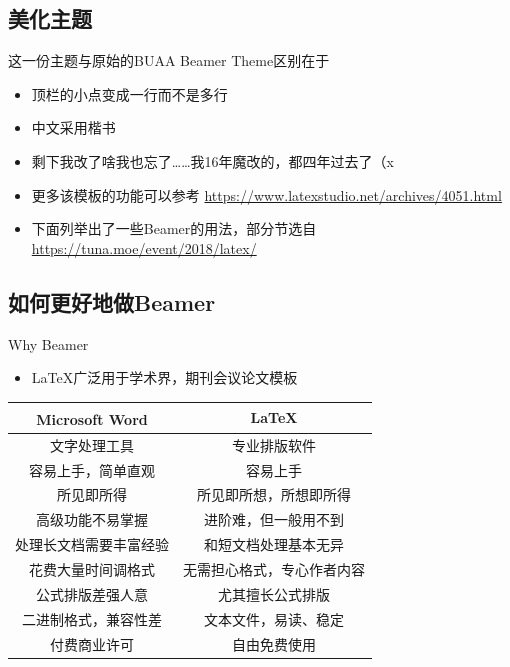 \documentclass{beamer}
\begin{document}
\subsection{美化主题}

\begin{frame}{这一份主题与原始的BUAA Beamer Theme区别在于}
	\begin{itemize}
		\item 顶栏的小点变成一行而不是多行
		\item 中文采用楷书
		\item 剩下我改了啥我也忘了……我16年魔改的，都四年过去了（x
		\item 更多该模板的功能可以参考 \url{https://www.latexstudio.net/archives/4051.html}
		\item 下面列举出了一些Beamer的用法，部分节选自 \url{https://tuna.moe/event/2018/latex/}
	\end{itemize}
\end{frame}

\subsection{如何更好地做Beamer}

\begin{frame}{Why Beamer}
	\begin{itemize}
		\item \LaTeX 广泛用于学术界，期刊会议论文模板
	\end{itemize}
	\begin{table}[h]
		\centering
		\begin{tabular}{c|c}
			Microsoft\textsuperscript{\textregistered}  Word & \LaTeX        \\
			\hline
			文字处理工具                                           & 专业排版软件        \\
			容易上手，简单直观                                        & 容易上手          \\
			所见即所得                                            & 所见即所想，所想即所得   \\
			高级功能不易掌握                                         & 进阶难，但一般用不到    \\
			处理长文档需要丰富经验                                      & 和短文档处理基本无异    \\
			花费大量时间调格式                                        & 无需担心格式，专心作者内容 \\
			公式排版差强人意                                         & 尤其擅长公式排版      \\
			二进制格式，兼容性差                                       & 文本文件，易读、稳定    \\
			付费商业许可                                           & 自由免费使用        \\
		\end{tabular}
	\end{table}
\end{frame}
\end{document}
